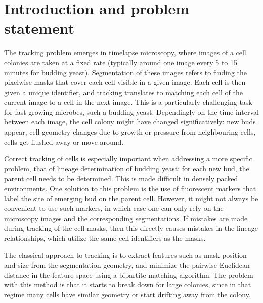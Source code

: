 \documentclass[10pt,conference,compsocconf,a4paper]{IEEEtran}
\begin{document}
\section{Introduction and problem statement}

	The tracking problem emerges in timelapse microscopy, where images of a cell colonies are taken at a fixed rate (typically around one image every 5 to 15 minutes for budding yeast). Segmentation of these images refers to finding the pixelwise masks that cover each cell visible in a given image. Each cell is then given a unique identifier, and tracking translates to matching each cell of the current image to a cell in the next image. This is a particularly challenging task for fast-growing microbes, such a budding yeast. Dependingly on the time interval between each image, the cell colony might have changed significatively: new buds appear, cell geometry changes due to growth or pressure from neighbouring cells, cells get flushed away or move around.

	Correct tracking of cells is especially important when addressing a more specific problem, that of lineage determination of budding yeast: for each new bud, the parent cell needs to be determined. This is made difficult in densely packed environments. One solution to this problem is the use of fluorescent markers that label the site of emerging bud on the parent cell. However, it might not always be convenient to use such markers, in which case one can only rely on the microscopy images and the corresponding segmentations. If mistakes are made during tracking of the cell masks, then this directly causes mistakes in the lineage relationships, which utilize the same cell identifiers as the masks.
	

	The classical approach to tracking is to extract features such as mask position and size from the segmentation geometry, %
	and minimize the pairwise Euclidean distance in the feature space using a bipartite matching algorithm. The problem with this method is that it starts to break down for large colonies, since in that regime many cells have similar geometry or start drifting away from the colony.
	
\end{document}
